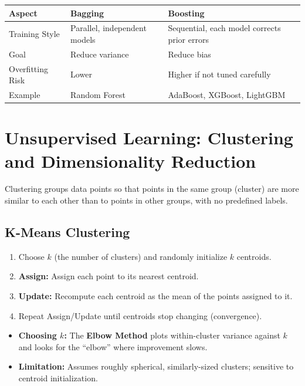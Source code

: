 \documentclass[11pt,a4paper]{article}
\begin{document}
\begin{center}
\begin{tabular}{@{}p{2.6cm}p{5.2cm}p{5.2cm}@{}}
\toprule
\rowcolor{primary!15}
\textbf{Aspect} & \textbf{Bagging} & \textbf{Boosting} \\
\midrule
Training Style & Parallel, independent models & Sequential, each model corrects prior errors \\
Goal & Reduce variance & Reduce bias \\
Overfitting Risk & Lower & Higher if not tuned carefully \\
Example & Random Forest & AdaBoost, XGBoost, LightGBM \\
\bottomrule
\end{tabular}
\end{center}

\section{Unsupervised Learning: Clustering and Dimensionality Reduction}

\begin{definitionbox}[Clustering]
Clustering groups data points so that points in the same group (cluster) are more similar to each other than to points in other groups, with no predefined labels.
\end{definitionbox}

\subsection{K-Means Clustering}
\begin{conceptbox}
\begin{enumerate}[leftmargin=*]
  \item Choose $k$ (the number of clusters) and randomly initialize $k$ centroids.
  \item \textbf{Assign:} Assign each point to its nearest centroid.
  \item \textbf{Update:} Recompute each centroid as the mean of the points assigned to it.
  \item Repeat Assign/Update until centroids stop changing (convergence).
\end{enumerate}
\end{conceptbox}
\begin{itemize}[leftmargin=*]
  \item \textbf{Choosing $k$:} The \textbf{Elbow Method} plots within-cluster variance against $k$ and looks for the ``elbow'' where improvement slows.
  \item \textbf{Limitation:} Assumes roughly spherical, similarly-sized clusters; sensitive to centroid initialization.
\end{itemize}
\end{document}
